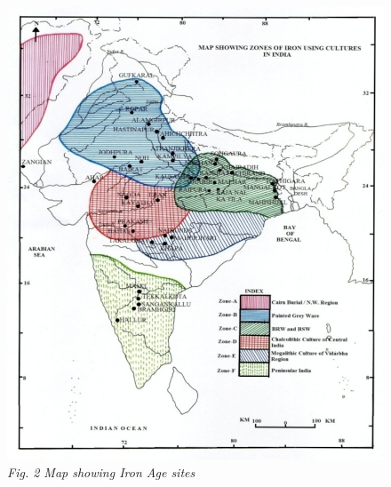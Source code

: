 \newpage
{
\setcounter{figure}{0}
\renewcommand{\thefigure}{1\Alph{figure}}
\begin{figure}[H]
\includegraphics[scale=0.23]{images/chapter-1/fig002.jpg}
\caption{\textit{Fig. 2 Map showing Iron Age sites}}\label{chapter1-fig002}
\end{figure}
}

